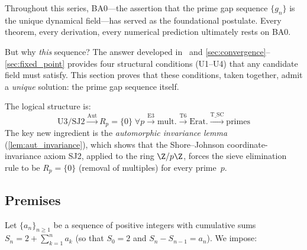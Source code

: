 \documentclass[12pt,a4paper]{article}
\begin{document}
Throughout this series, BA0---the assertion that the prime gap sequence
$\{g_n\}$ is the unique dynamical field---has served as the foundational
postulate. Every theorem, every derivation, every numerical prediction
ultimately rests on BA0.

But why \emph{this} sequence? The answer developed in~\cite{companion_M1}
and \cref{sec:convergence}--\cref{sec:fixed_point}
provides four structural conditions (U1--U4) that any candidate field
must satisfy. This section proves that these conditions, taken together,
admit a \emph{unique} solution: the prime gap sequence itself.

The logical structure is:
\begin{equation}
  \text{U3/SJ2} \xrightarrow{\text{Aut}} R_p = \{0\}\;\forall p
  \xrightarrow{\text{E3}} \text{mult.}
  \xrightarrow{\text{T6}} \text{Erat.}
  \xrightarrow{\text{T\_SC}} \text{primes}
  \label{eq:T0_chain}
\end{equation}
The key new ingredient is the \emph{automorphic invariance lemma}
(\cref{lem:aut_invariance}), which shows that the Shore--Johnson
coordinate-invariance axiom SJ2, applied to the ring $\Z/p\Z$,
forces the sieve elimination rule to be $R_p = \{0\}$ (removal of
multiples) for every prime~$p$.

\subsection{Premises}
\label{sec:ch25_premises}

Let $\{a_n\}_{n \geq 1}$ be a sequence of positive integers with
cumulative sums $S_n = 2 + \sum_{k=1}^{n} a_k$ (so that $S_0 = 2$
and $S_n - S_{n-1} = a_n$). We impose:
\end{document}

